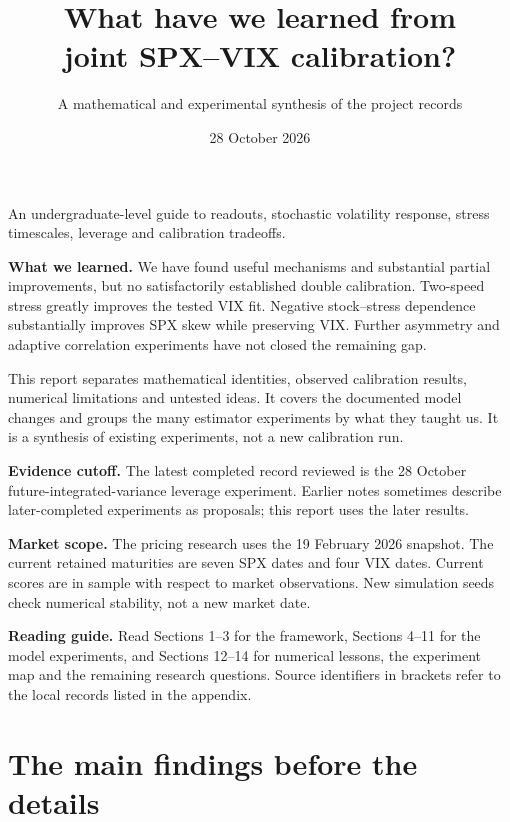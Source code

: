 \documentclass[11pt,a4paper]{article}
\title{\color{navy}\Huge What have we learned from\\[4pt]joint SPX--VIX calibration?}
\author{A mathematical and experimental synthesis of the project records}
\date{28 October 2026}
\newcommand{\lesson}[1]{\par\smallskip\noindent\colorbox{teal!9}{\parbox{\dimexpr\linewidth-2\fboxsep}{\textbf{What we learned.} #1}}\par\smallskip}
\begin{document}
\hypersetup{pageanchor=false}
\begin{titlepage}
\maketitle\thispagestyle{empty}
\vspace{8mm}
{\large An undergraduate-level guide to readouts, stochastic volatility response, stress timescales, leverage and calibration tradeoffs.}
\vspace{9mm}
\lesson{We have found useful mechanisms and substantial partial improvements, but no satisfactorily established double calibration. Two-speed stress greatly improves the tested VIX fit. Negative stock--stress dependence substantially improves SPX skew while preserving VIX. Further asymmetry and adaptive correlation experiments have not closed the remaining gap.}
\vspace{5mm}
This report separates mathematical identities, observed calibration results, numerical limitations and untested ideas. It covers the documented model changes and groups the many estimator experiments by what they taught us. It is a synthesis of existing experiments, not a new calibration run.

\textbf{Evidence cutoff.} The latest completed record reviewed is the 28 October future-integrated-variance leverage experiment. Earlier notes sometimes describe later-completed experiments as proposals; this report uses the later results.

\textbf{Market scope.} The pricing research uses the 19 February 2026 snapshot. The current retained maturities are seven SPX dates and four VIX dates. Current scores are in sample with respect to market observations. New simulation seeds check numerical stability, not a new market date.

\vfill
\textbf{Reading guide.} Read Sections 1--3 for the framework, Sections 4--11 for the model experiments, and Sections 12--14 for numerical lessons, the experiment map and the remaining research questions. Source identifiers in brackets refer to the local records listed in the appendix.
\end{titlepage}
\hypersetup{pageanchor=true}
\tableofcontents\clearpage
{}

\section{The main findings before the details}
\end{document}
